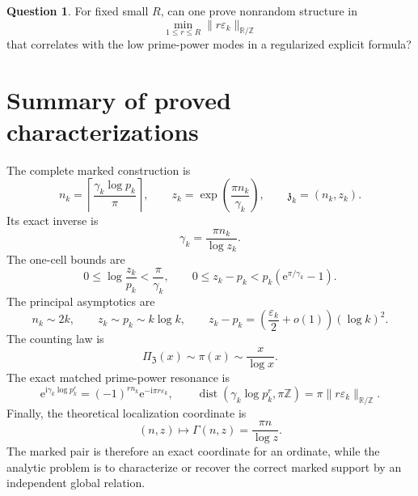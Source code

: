 \documentclass[11pt]{amsart}
\numberwithin{equation}{section}
\theoremstyle{plain}
\theoremstyle{definition}
\newtheorem{question}[theorem]{Question}
\theoremstyle{remark}
\newcommand{\e}{\mathrm e}
\newcommand{\ii}{\mathrm i}
\newcommand{\dist}{\operatorname{dist}}
\newcommand{\ZP}{\mathfrak Z}
\newcommand{\R}{\mathbb R}
\begin{document}
\begin{question}
\label{question:low_power_resonance}
For fixed small $R$, can one prove nonrandom structure in
\begin{equation}
 \min_{1\leq r\leq R}\|r\varepsilon_k\|_{\R/\mathbb Z}
 \label{eq:low_power_resonance_statistic}
\end{equation}
that correlates with the low prime-power modes in a regularized explicit
formula?
\end{question}

\section{Summary of proved characterizations}
\label{sec:summary}

The complete marked construction is
\begin{equation}
 \boxed{
 n_k=\left\lceil\frac{\gamma_k\log p_k}{\pi}\right\rceil,
 \qquad
 z_k=\exp\left(\frac{\pi n_k}{\gamma_k}\right),
 \qquad
 \mathfrak z_k=(n_k,z_k).
 }
 \label{eq:summary_construction}
\end{equation}
Its exact inverse is
\begin{equation}
 \boxed{
 \gamma_k=\frac{\pi n_k}{\log z_k}.
 }
 \label{eq:summary_inverse}
\end{equation}
The one-cell bounds are
\begin{equation}
 \boxed{
 0\leq\log\frac{z_k}{p_k}<\frac{\pi}{\gamma_k},
 \qquad
 0\leq z_k-p_k<p_k\left(\e^{\pi/\gamma_k}-1\right).
 }
 \label{eq:summary_exact_bounds}
\end{equation}
The principal asymptotics are
\begin{equation}
 \boxed{
 n_k\sim2k,
 \qquad
 z_k\sim p_k\sim k\log k,
 \qquad
 z_k-p_k
 =\left(\frac{\varepsilon_k}{2}+o(1)\right)(\log k)^2.
 }
 \label{eq:summary_asymptotics}
\end{equation}
The counting law is
\begin{equation}
 \boxed{
 \Pi_{\ZP}(x)\sim\pi(x)\sim\frac{x}{\log x}.
 }
 \label{eq:summary_counting}
\end{equation}
The exact matched prime-power resonance is
\begin{equation}
 \boxed{
 \e^{\ii\gamma_k\log p_k^r}
 =(-1)^{rn_k}\e^{-\ii\pi r\varepsilon_k},
 \qquad
 \dist(\gamma_k\log p_k^r,\pi\mathbb Z)
 =\pi\|r\varepsilon_k\|_{\R/\mathbb Z}.
 }
 \label{eq:summary_resonance}
\end{equation}
Finally, the theoretical localization coordinate is
\begin{equation}
 \boxed{
 (n,z)\longmapsto\Gamma(n,z)=\frac{\pi n}{\log z}.
 }
 \label{eq:summary_lattice_map}
\end{equation}
The marked pair is therefore an exact coordinate for an ordinate, while the
analytic problem is to characterize or recover the correct marked support by
an independent global relation.
\end{document}
